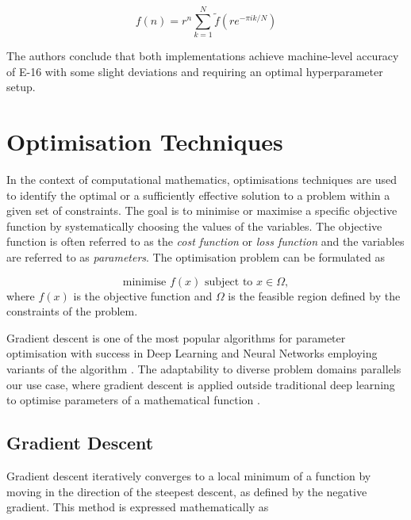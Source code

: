 \documentclass[a4paper]{report}
\begin{document}
\begin{equation}\label{equation:cavers_sum}
	f(n) = r^n \sum^{N}_{k = 1} \tilde{f}(re^{-\pi ik/N})
\end{equation}

The authors conclude that both implementations achieve machine-level accuracy of E-16 with some slight deviations and requiring an optimal hyperparameter setup.

\section{Optimisation Techniques}\label{section:optimisation_techniques}
In the context of computational mathematics, optimisations techniques are used to identify the optimal or a sufficiently effective solution to a problem within a given set of constraints. The goal is to minimise or maximise a specific objective function by systematically choosing the values of the variables. The objective function is often referred to as the \textit{cost function} or \textit{loss function} and the variables are referred to as \textit{parameters}. The optimisation problem can be formulated as

\begin{equation}\label{optimisation_problem}
	\text{minimise } f(x) \text{ subject to } x \in \Omega,
\end{equation}
where $f(x)$ is the objective function and $\Omega$ is the feasible region defined by the constraints of the problem.

Gradient descent is one of the most popular algorithms for parameter optimisation with success in Deep Learning and Neural Networks employing variants of the algorithm \citep{lu2017improved, zhang2019gradient, zeebaree2019trainable}. The adaptability to diverse problem domains \citep{YingjieYugiHaibin2023SGD} parallels our use case, where gradient descent is applied outside traditional deep learning to optimise parameters of a mathematical function \citep{GradientBasedOpt2022}.

\subsection{Gradient Descent}
Gradient descent iteratively converges to a local minimum of a function by moving in the direction of the steepest descent, as defined by the negative gradient. This method is expressed mathematically as
\end{document}
